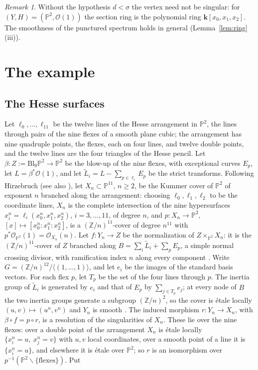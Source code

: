 \documentclass[11pt]{amsart}
\theoremstyle{remark}
\newtheorem{remark}[theorem]{Remark}
\theoremstyle{definition}
\newcommand{\PP}{\mathbb{P}}
\newcommand{\ZZ}{\mathbb{Z}}
\newcommand{\bk}{\mathbf{k}}
\newcommand{\cO}{\mathcal{O}}
\begin{document}
\begin{remark}
Without the hypothesis $d<\sigma$ the vertex need not be singular: for $(Y,H)=(\PP^2,\cO(1))$ the section ring is the polynomial ring $\bk[x_0,x_1,x_2]$. The smoothness of the punctured spectrum holds in general (Lemma~\ref{lem:ring}(iii)).
\end{remark}

\section{The example}\label{sec:example}

\subsection*{The Hesse surfaces}
Let $\ell_0,\dots,\ell_{11}$ be the twelve lines of the Hesse arrangement in $\PP^2$, the lines through pairs of the nine flexes of a smooth plane cubic; the arrangement has nine quadruple points, the flexes, each on four lines, and twelve double points, and the twelve lines are the four triangles of the Hesse pencil. Let $\beta\colon Z:=\mathrm{Bl}_9\PP^2\to\PP^2$ be the blow-up of the nine flexes, with exceptional curves $E_p$, let $L=\beta^*\cO(1)$, and let $\tilde L_i=L-\sum_{p\in\ell_i}E_p$ be the strict transforms. Following Hirzebruch \cite{Hi} (see also \cite{BHH}), let $X_n\subset\PP^{11}$, $n\ge2$, be the Kummer cover of $\PP^2$ of exponent $n$ branched along the arrangement: choosing $\ell_0,\ell_1,\ell_2$ to be the coordinate lines, $X_n$ is the complete intersection of the nine hypersurfaces $x_i^n=\ell_i(x_0^n,x_1^n,x_2^n)$, $i=3,\dots,11$, of degree $n$, and $p\colon X_n\to\PP^2$, $[x]\mapsto[x_0^n:x_1^n:x_2^n]$, is a $(\ZZ/n)^{11}$-cover of degree $n^{11}$ with $p^*\cO_{\PP^2}(1)=\cO_{X_n}(n)$. Let $f\colon Y_n\to Z$ be the normalization of $Z\times_{\PP^2}X_n$: it is the $(\ZZ/n)^{11}$-cover of $Z$ branched along $B=\sum_i\tilde L_i+\sum_pE_p$, a simple normal crossing divisor, with ramification index $n$ along every component \cite{Hi,Pa}. Write $G=(\ZZ/n)^{12}/\langle(1,\dots,1)\rangle$, and let $e_i$ be the images of the standard basis vectors. For each flex $p$, let $T_p$ be the set of the four lines through $p$. The inertia group of $\tilde L_i$ is generated by $e_i$ and that of $E_p$ by $\sum_{j\in T_p}e_j$; at every node of $B$ the two inertia groups generate a subgroup $(\ZZ/n)^2$, so the cover is \'etale locally $(u,v)\mapsto(u^n,v^n)$ and $Y_n$ is smooth \cite{Pa}.
The induced morphism $r\colon Y_n\to X_n$, with $\beta\circ f=p\circ r$, is a resolution of the singularities of $X_n$. These lie over the nine flexes: over a double point of the arrangement $X_n$ is \'etale locally $\{x_i^n=u,\ x_j^n=v\}$ with $u,v$ local coordinates, over a smooth point of a line it is $\{x_i^n=u\}$, and elsewhere it is \'etale over $\PP^2$; so $r$ is an isomorphism over $p^{-1}(\PP^2\smallsetminus\{\text{flexes}\})$. Put
\end{document}
